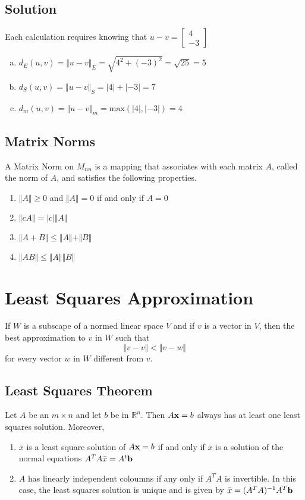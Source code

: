 \subsection*{Solution}
Each calculation requires knowing that $u-v=\begin{bmatrix}
        4 \\-3
    \end{bmatrix}$
\begin{enumerate}[(a)]
    \item $d_E(u,v)=\Vert u-v\Vert_E=\sqrt{4^2+(-3)^2}=\sqrt{25}=5$
    \item $d_S(u,v)=\Vert u-v\Vert_S=|4|+|-3|=7$
    \item $d_m(u,v)=\Vert u-v\Vert_m=\text{max}(|4|,|-3|)=4$
\end{enumerate}

\subsection*{Matrix Norms}
A Matrix Norm on $M_{nn}$ is a mapping that associates with each matrix $A$,
called the norm of $A$, and satisfies the following properties.
\begin{enumerate}
    \item $\Vert A\Vert\geq0$ and $\Vert A\Vert=0$ if and only if $A=0$
    \item $\Vert cA\Vert=|c|\Vert A\Vert$
    \item $\Vert A+B\Vert\leq\Vert A\Vert+\Vert B\Vert$
    \item $\Vert AB\Vert\leq\Vert A\Vert\Vert B\Vert$
\end{enumerate}

\section{Least Squares Approximation}
If $W$ is a subscape of a normed linear space $V$ and if $v$ is a vector in $V$,
then the best approximation to $v$ in $W$ such that
\[\Vert v-v \Vert < \Vert v-w \Vert\]
for every vector $w$ in $W$ different from $v$.

\subsection*{Least Squares Theorem}
Let $A$ be an $m\times n$ and let $b$ be in $\mathbb{R}^n$. Then
$A\mathbf{x} = b$ always has at least one least squares solution. Moreover,
\begin{enumerate}
    \item $\bar{x}$ is a least square solution of $A\mathbf{x} = b$ if and only if $\bar{x}$
          is a solution of the normal equations $A^TA\bar{x}=A^t\mathbf{b}$
    \item $A$ has linearly independent coloumns if any only if $A^TA$ is invertible.
          In this case, the least squares solution is unique and is given by
          $\bar{x}=(A^TA)^{-1}A^T\mathbf{b}$
\end{enumerate}

